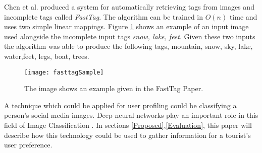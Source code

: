    Chen et al. \cite{Chen2013} produced a system for automatically
    retrieving tags from images and incomplete tags called
    \emph{FastTag}. The algorithm can be trained in \(O(n)\) time and
    uses two simple linear mappings. Figure \ref{fasttag} shows an
    example of an input image used alongside the incomplete input tags
    \emph{snow, lake, feet}. Given these two inputs the algorithm was
    able to produce the following tags, {mountain, snow, sky, lake, water,feet, legs,
    boat, trees}.
    \begin{figure}[H]
        \caption{The image shows an example given in the FastTag
        Paper.\cite{Chen2013}}
        \centering
        \texttt{[image: fasttagSample]}
        \label{fasttag}
    \end{figure}

    A technique which could be applied for user profiling could be
    classifying a person’s social media images. Deep neural networks
    play an important role in this field of Image Classification 
    \cite{Balaji2019,Cufoglu}. In sections \ref{Proposed},\ref{Evaluation},
    this paper will describe how this technology could be used to
    gather information for a tourist’s user preference. 

    
